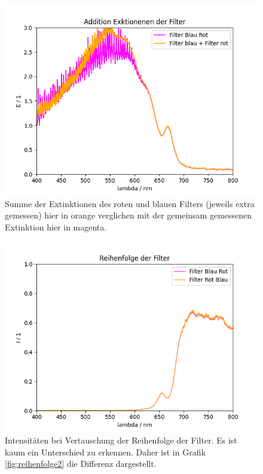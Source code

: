 \documentclass{article}
\begin{document}
\begin{figure}[H]
\centering
\caption{Summe der Extinktionen des roten und blauen Filters (jeweils extra gemessen) hier in orange verglichen mit der gemeinsam gemessenen Extinktion hier in magenta.}
\label{fig:T}
\includegraphics[scale=0.7]{Extinktionen_addition.png}
\end{figure}


\begin{figure}[H]
\centering
\caption{Intensitäten bei Vertauschung der Reihenfolge der Filter. Es ist kaum ein Unterschied zu erkennen. Daher ist in Grafik \ref{fig:reihenfolge2} die Differenz dargestellt.}
\label{fig:reihenfolge1}

\includegraphics[scale=0.7]{reihenfolge1.png}
\end{figure}
\end{document}
